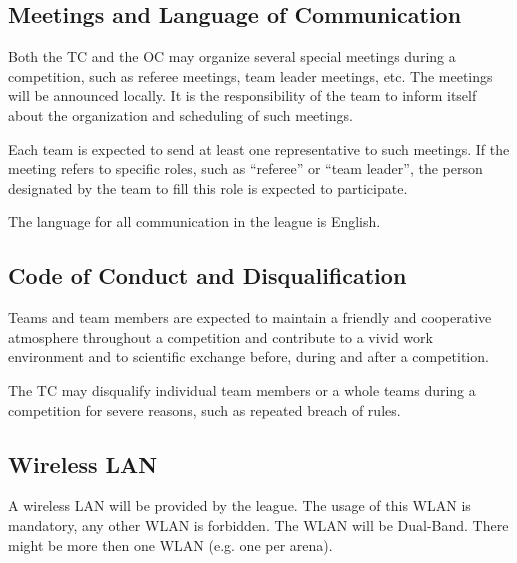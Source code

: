 \subsection{Meetings and Language of Communication}
Both the TC and the OC may organize several special meetings during a competition, such as referee meetings, team leader meetings, etc. The meetings will be announced locally. It is the responsibility of the team to inform itself about the organization and scheduling of such meetings.
\par
Each team is expected to send at least one representative to such meetings. If the meeting refers to specific roles, such as “referee” or “team leader”, the person designated by the team to fill this role is expected to participate.
\par
The language for all communication in the league is English.

\subsection{Code of Conduct and Disqualification}
Teams and team members are expected to maintain a friendly and cooperative atmosphere throughout a competition and contribute to a vivid work environment and to scientific exchange before, during and after a competition.
\par
The TC may disqualify individual team members or a whole teams during a competition for severe reasons, such as repeated breach of rules.

\subsection{Wireless LAN}
A wireless LAN will be provided by the league. The usage of this WLAN is mandatory, any other WLAN is forbidden. The WLAN will be Dual-Band. There might be more then one WLAN (e.g. one per arena).

